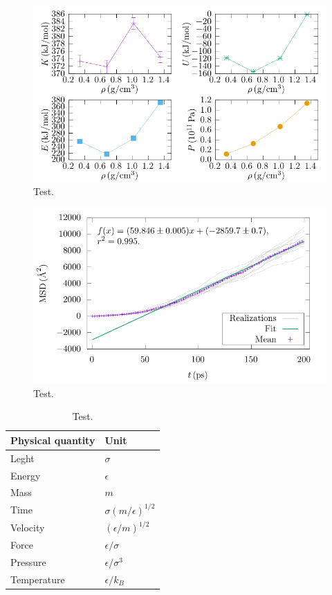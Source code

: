 \documentclass{article}
\begin{document}
  \begin{figure}[htb]
    \centering
    \includegraphics[width=\linewidth]{../figures/liquid_quantities.pdf}
    \caption{Test.}\label{fig:liquid}
  \end{figure}

  \begin{figure}[htb]
    \centering
    \includegraphics[width=\linewidth]{../figures/msd.pdf}
    \caption{Test.}\label{fig:msd}
  \end{figure}

  \begin{table}[htb]
    \centering
    \caption{Test.}\label{tab:units}
    \begin{tabular}{ll}\hline
      Physical quantity & Unit                         \\\hline\hline
      Leght             & \(\sigma\)                   \\
      Energy            & \(\epsilon\)                 \\
      Mass              & \(m\)                        \\
      Time              & \(\sigma(m/\epsilon)^{1/2}\) \\
      Velocity          & \((\epsilon/m)^{1/2}\)       \\
      Force             & \(\epsilon/\sigma\)          \\
      Pressure          & \(\epsilon/\sigma^{3}\)      \\
      Temperature       & \(\epsilon/k_{B}\)           \\\hline
    \end{tabular}
  \end{table}
\end{document}
